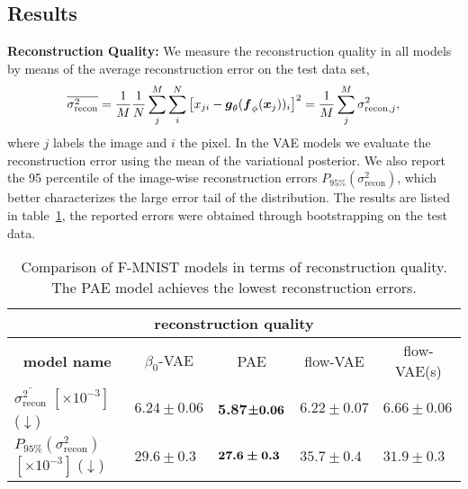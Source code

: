 \documentclass[10pt]{article} \usepackage[accepted]{tmlr}
\def\bi#1{\hbox{\boldmath{$#1$}}}
\newcommand{\rev}[1]{{\color{black}#1}}
\begin{document}
\subsection{Results}
\label{sec:results}
\textbf{Reconstruction Quality:} We measure the reconstruction quality in all models by means of the average reconstruction error on the test data set,
\begin{equation}
    \overline{\sigma_\mathrm{recon}^2} = \frac{1}{M} \frac{1}{N} \sum_j^M \sum_i^N \left[x_{ji} - \bi{g}_{\theta}(\bi{f}_{\phi}(\bi{x}_j))_i\right]^2 = \frac{1}{M} \sum_j^M \sigma_{\mathrm{recon},j}^2,
\end{equation}
where $j$ labels the image and $i$ the pixel. \rev{In the VAE models we evaluate the reconstruction error using the mean of the variational posterior}. We also report the 95 percentile of the image-wise reconstruction errors $P_{95\%}(\sigma_{\mathrm{recon}}^2)$, which better characterizes the large error tail of the distribution. The results are listed in table~\ref{tab:recons}, the reported errors were obtained through bootstrapping on the test data.
\begin{table}[h]
\begin{center}
\begin{tabular}{lllll}
\multicolumn{5}{c}{\textbf{reconstruction quality}}                                                                                   \\ \hline
\multicolumn{1}{c|}{\textbf{model name}}   & \multicolumn{1}{c|}{$\beta_0$-VAE} & \multicolumn{1}{c|}{PAE}         & \multicolumn{1}{c|}{flow-VAE} & \multicolumn{1}{c}{flow-VAE(s)} \\ \hline
\multicolumn{1}{l|}{$\overline{\sigma_\mathrm{recon}^2}$ $[\times10^{-3}]$ ($\downarrow$)} & \multicolumn{1}{l|}{$6.24\pm0.06$}       & \multicolumn{1}{l|}{\textbf{5.87}$\bi \pm\bi{0.06}$}& \multicolumn{1}{l|}{$6.22\pm0.07$} &       $6.66\pm0.06$      \\
\multicolumn{1}{l|}{$P_{95\%}(\sigma_{\mathrm{recon}}^2)$ $[\times10^{-3}]$ ($\downarrow$)} & \multicolumn{1}{l|}{$29.6\pm0.3$}       & \multicolumn{1}{l|}{$\bi{27.6\pm0.3}$} &  \multicolumn{1}{l|}{$35.7 \pm 0.4$} &  $31.9\pm0.3$ \\
\end{tabular}
\end{center}
\caption{\label{tab:recons} Comparison of F-MNIST models in terms of reconstruction quality. The PAE model achieves the lowest reconstruction errors.}
\end{table}
\end{document}
